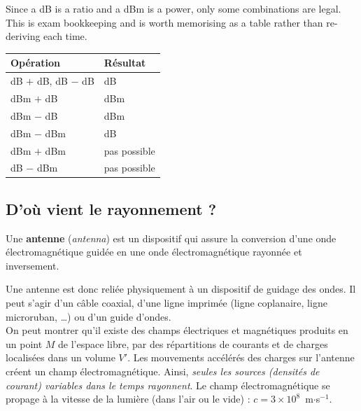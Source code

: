 Since a dB is a ratio and a dBm is a power, only some combinations are legal.
This is exam bookkeeping and is worth memorising as a table rather than
re-deriving each time.

\begin{center}
  \begin{tabular}{@{}ll@{}}
    \toprule
    Opération & Résultat \\
    \midrule
    dB $+$ dB, \quad dB $-$ dB & dB \\
    dBm $+$ dB & dBm \\
    dBm $-$ dB & dBm \\
    dBm $-$ dBm & dB \\
    \midrule
    dBm $+$ dBm & pas possible \\
    dB $-$ dBm & pas possible \\
    \bottomrule
  \end{tabular}
\end{center}

\subsection{D'où vient le rayonnement ?}

\begin{definition}[Antenne]
  Une \textbf{antenne} (\textit{antenna}) est un dispositif qui assure la
  conversion d'une onde électromagnétique guidée en une onde électromagnétique
  rayonnée et inversement.
\end{definition}

Une antenne est donc reliée physiquement à un dispositif de guidage des ondes.
Il peut s'agir d'un câble coaxial, d'une ligne imprimée (ligne coplanaire,
ligne microruban, \ldots) ou d'un guide d'ondes.\\

On peut montrer qu'il existe des champs électriques et magnétiques produits en
un point $M$ de l'espace libre, par des répartitions de courants et de charges
localisées dans un volume $V'$. Les mouvements accélérés des charges sur
l'antenne créent un champ électromagnétique. Ainsi, \emph{seules les sources
(densités de courant) variables dans le temps rayonnent}. Le champ
électromagnétique se propage à la vitesse de la lumière (dans l'air ou le
vide) : $c = 3 \times 10^8$~m$\cdot$s$^{-1}$.

